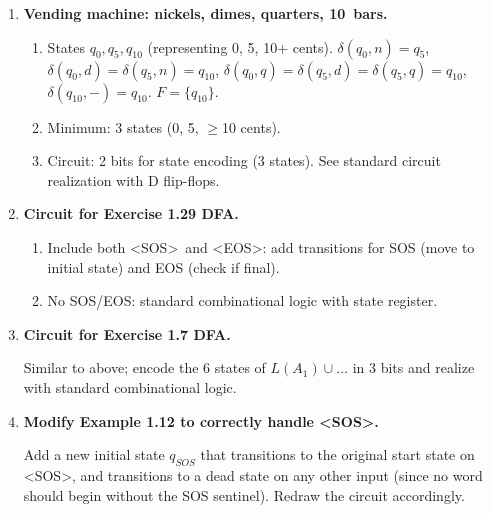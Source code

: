 \documentclass[11pt]{book}
\def\cent{\text{\textcent}}
\begin{document}
\begin{enumerate}[{1.}1.]
\begin{enumerate}
\item 11 states.

\item The minimum is 11 states (must track exact amount from 0 to 10 cents).
\end{enumerate}

\item \textbf{Vending machine: nickels, dimes, quarters, 10\cent\ bars.}

\begin{enumerate}
\item States $q_0,q_5,q_{10}$ (representing 0, 5, 10+ cents). $\delta(q_0,n)=q_5$, $\delta(q_0,d)=\delta(q_5,n)=q_{10}$, $\delta(q_0,q)=\delta(q_5,d)=\delta(q_5,q)=q_{10}$, $\delta(q_{10},-)=q_{10}$. $F=\{q_{10}\}$.

\item Minimum: 3 states (0, 5, $\geq$10 cents).

\item Circuit: 2 bits for state encoding (3 states). See standard circuit realization with D flip-flops.
\end{enumerate}

\item \textbf{Circuit for Exercise 1.29 DFA.}
\begin{enumerate}
\item Include both \textless SOS\textgreater\ and \textless EOS\textgreater: add transitions for SOS (move to initial state) and EOS (check if final).
\item No SOS/EOS: standard combinational logic with state register.
\end{enumerate}

\item \textbf{Circuit for Exercise 1.7 DFA.}

Similar to above; encode the 6 states of $L(A_1)\cup\ldots$ in 3 bits and realize with standard combinational logic.

\item \textbf{Modify Example 1.12 to correctly handle \textless SOS\textgreater.}

Add a new initial state $q_{SOS}$ that transitions to the original start state on \textless SOS\textgreater, and transitions to a dead state on any other input (since no word should begin without the SOS sentinel). Redraw the circuit accordingly.


\end{enumerate}
\end{document}
